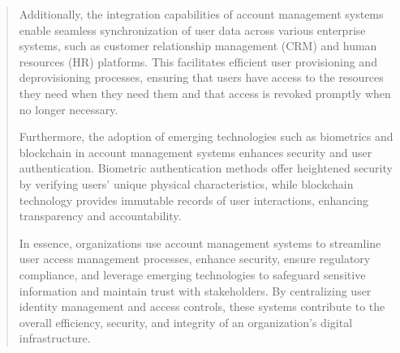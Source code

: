 \documentclass[12pt]{report}
\begin{document}
\begin{quote}
	Additionally, the integration capabilities of account management systems enable seamless synchronization of user data across various enterprise systems, such as customer relationship management (CRM) and human resources (HR) platforms. This facilitates efficient user provisioning and deprovisioning processes, ensuring that users have access to the resources they need when they need them and that access is revoked promptly when no longer necessary.
	
	Furthermore, the adoption of emerging technologies such as biometrics and blockchain in account management systems enhances security and user authentication. Biometric authentication methods offer heightened security by verifying users' unique physical characteristics, while blockchain technology provides immutable records of user interactions, enhancing transparency and accountability.
	
	In essence, organizations use account management systems to streamline user access management processes, enhance security, ensure regulatory compliance, and leverage emerging technologies to safeguard sensitive information and maintain trust with stakeholders. By centralizing user identity management and access controls, these systems contribute to the overall efficiency, security, and integrity of an organization's digital infrastructure.
	
	\end{quote}
	\clearpage
	
\end{document}
